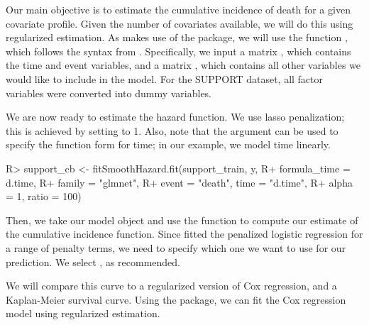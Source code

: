 \documentclass[
]{jss}
\begin{document}
Our main objective is to estimate the cumulative incidence of death for
a given covariate profile. Given the number of covariates available, we
will do this using regularized estimation. As  makes use
of the  package, we will use the function
, which follows the syntax from .
Specifically, we input a matrix , which contains the time and
event variables, and a matrix , which contains all other
variables we would like to include in the model. For the SUPPORT
dataset, all factor variables were converted into dummy variables.

We are now ready to estimate the hazard function. We use lasso
penalization; this is achieved by setting  to 1. Also, note
that the argument  can be used to specify the
function form for time; in our example, we model time linearly.

\begin{CodeChunk}

\begin{CodeInput}
R> support_cb <- fitSmoothHazard.fit(support_train, y, 
R+                                   formula_time = ~ d.time, 
R+                                   family = "glmnet", 
R+                                   event = "death", time = "d.time", 
R+                                   alpha = 1, ratio = 100)
\end{CodeInput}
\end{CodeChunk}

Then, we take our model object and use the  function
to compute our estimate of the cumulative incidence function. Since
 fitted the penalized logistic regression for a range of
penalty terms, we need to specify which one we want to use for our
prediction. We select , as recommended.

\begin{CodeChunk}

\end{CodeChunk}

We will compare this curve to a regularized version of Cox regression,
and a Kaplan-Meier survival curve. Using the  package, we
can fit the Cox regression model using regularized estimation.
\end{document}
